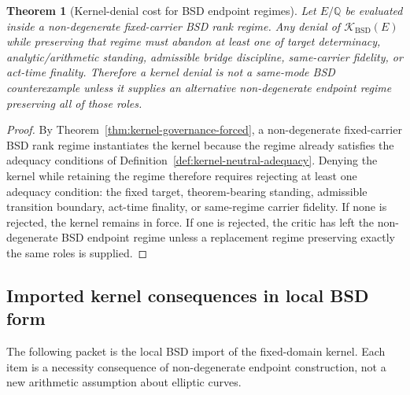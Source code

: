 \documentclass[11pt]{article}
\newtheorem{theorem}{Theorem}[section]
\newcommand{\Q}{\mathbb{Q}}
\newcommand{\BSD}{\mathrm{BSD}}
\newcommand{\Kern}{\mathcal{K}}
\begin{document}
\begin{theorem}[Kernel-denial cost for BSD endpoint regimes]\label{thm:kernel-denial-cost}
Let $E/\Q$ be evaluated inside a non-degenerate fixed-carrier BSD rank regime. Any denial of $\Kern_{\BSD}(E)$ while preserving that regime must abandon at least one of target determinacy, analytic/arithmetic standing, admissible bridge discipline, same-carrier fidelity, or act-time finality. Therefore a kernel denial is not a same-mode BSD counterexample unless it supplies an alternative non-degenerate endpoint regime preserving all of those roles.
\end{theorem}

\begin{proof}
By Theorem~\ref{thm:kernel-governance-forced}, a non-degenerate fixed-carrier BSD rank regime instantiates the kernel because the regime already satisfies the adequacy conditions of Definition~\ref{def:kernel-neutral-adequacy}. Denying the kernel while retaining the regime therefore requires rejecting at least one adequacy condition: the fixed target, theorem-bearing standing, admissible transition boundary, act-time finality, or same-regime carrier fidelity. If none is rejected, the kernel remains in force. If one is rejected, the critic has left the non-degenerate BSD endpoint regime unless a replacement regime preserving exactly the same roles is supplied.
\end{proof}

\subsection{Imported kernel consequences in local BSD form}

The following packet is the local BSD import of the fixed-domain kernel. Each item is a necessity consequence of non-degenerate endpoint construction, not a new arithmetic assumption about elliptic curves.
\end{document}
